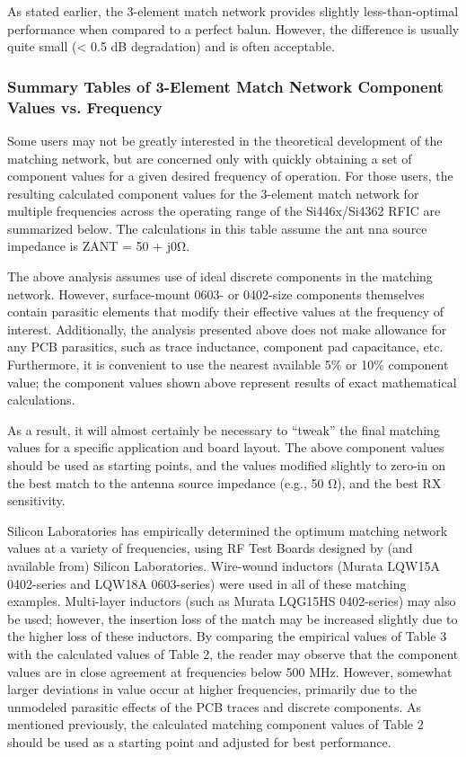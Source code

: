         As stated earlier, the 3-element match network provides slightly less-than-optimal 
        performance when compared to a perfect balun. However, the difference is usually quite 
        small (< 0.5 dB degradation) and is often acceptable. 
        
      \subsubsection{Summary Tables of 3-Element Match Network Component Values vs. Frequency}
        Some users may not be greatly interested in the theoretical development of the matching 
        network, but are concerned only with quickly obtaining a set of component values for a 
        given desired frequency of operation. For those users, the resulting calculated component 
        values for the 3-element match network for multiple frequencies across the operating range 
        of the Si446x/Si4362 RFIC are summarized below. The calculations in this table assume the 
        ant nna source impedance is ZANT = 50 + j0Ω.
        
        The above analysis assumes use of ideal discrete components in the matching network. 
        However, surface-mount 0603- or 0402-size components themselves contain parasitic elements 
        that modify their effective values at the  frequency of interest. Additionally, the 
        analysis presented above does not make allowance for any PCB parasitics, such as trace 
        inductance, component pad capacitance, etc. Furthermore, it is convenient to use the 
        nearest available 5\% or 10\% component value; the component values shown above represent 
        results of exact mathematical calculations.
        
        As a result, it will almost certainly be necessary to “tweak” the final matching values for 
        a specific application and board layout. The above component values should be used as 
        starting points, and the values modified slightly to zero-in on the best match to the 
        antenna source impedance (e.g., 50 Ω), and the best RX sensitivity.
        
        Silicon Laboratories has empirically determined the optimum matching network values at a 
        variety of frequencies, using RF Test Boards designed by (and available from) Silicon 
        Laboratories. Wire-wound inductors (Murata LQW15A 0402-series and LQW18A 0603-series) were 
        used in all of these matching examples. Multi-layer inductors (such as Murata LQG15HS 
        0402-series) may also be used; however, the insertion loss of the match may be increased 
        slightly due to the higher loss of these inductors. By comparing the empirical values of 
        Table 3 with the calculated values of Table 2, the reader may observe that the component 
        values are in close agreement at frequencies below 500 MHz. However, somewhat larger 
        deviations in value occur at higher frequencies, primarily due to the unmodeled 
        parasitic effects of the PCB traces and discrete components. As mentioned previously, the 
        calculated matching component values of Table 2 should be used as a starting point and 
        adjusted for best performance.
        
